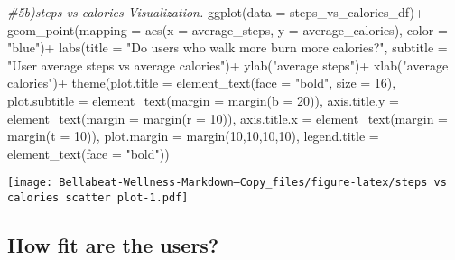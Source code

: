 \documentclass[
]{article}
\newenvironment{Shaded}{\begin{snugshade}}{\end{snugshade}}
\newcommand{\AttributeTok}[1]{\textcolor[rgb]{0.77,0.63,0.00}{#1}}
\newcommand{\CommentTok}[1]{\textcolor[rgb]{0.56,0.35,0.01}{\textit{#1}}}
\newcommand{\DecValTok}[1]{\textcolor[rgb]{0.00,0.00,0.81}{#1}}
\newcommand{\FunctionTok}[1]{\textcolor[rgb]{0.00,0.00,0.00}{#1}}
\newcommand{\NormalTok}[1]{#1}
\newcommand{\SpecialCharTok}[1]{\textcolor[rgb]{0.00,0.00,0.00}{#1}}
\newcommand{\StringTok}[1]{\textcolor[rgb]{0.31,0.60,0.02}{#1}}
\begin{document}
\begin{Shaded}
\begin{Highlighting}[]
\CommentTok{\#5b)steps vs calories Visualization.}
\FunctionTok{ggplot}\NormalTok{(}\AttributeTok{data =}\NormalTok{ steps\_vs\_calories\_df)}\SpecialCharTok{+}
  \FunctionTok{geom\_point}\NormalTok{(}\AttributeTok{mapping =} \FunctionTok{aes}\NormalTok{(}\AttributeTok{x =}\NormalTok{ average\_steps, }\AttributeTok{y =}\NormalTok{ average\_calories),}
             \AttributeTok{color =} \StringTok{"blue"}\NormalTok{)}\SpecialCharTok{+}
  \FunctionTok{labs}\NormalTok{(}\AttributeTok{title =} \StringTok{"Do users who walk more burn more calories?"}\NormalTok{,}
       \AttributeTok{subtitle =} \StringTok{"User average steps vs average calories"}\NormalTok{)}\SpecialCharTok{+}
  \FunctionTok{ylab}\NormalTok{(}\StringTok{"average steps"}\NormalTok{)}\SpecialCharTok{+}
   \FunctionTok{xlab}\NormalTok{(}\StringTok{"average calories"}\NormalTok{)}\SpecialCharTok{+}
  \FunctionTok{theme}\NormalTok{(}\AttributeTok{plot.title =} \FunctionTok{element\_text}\NormalTok{(}\AttributeTok{face =} \StringTok{"bold"}\NormalTok{, }\AttributeTok{size =} \DecValTok{16}\NormalTok{),}
        \AttributeTok{plot.subtitle =} \FunctionTok{element\_text}\NormalTok{(}\AttributeTok{margin =} \FunctionTok{margin}\NormalTok{(}\AttributeTok{b =} \DecValTok{20}\NormalTok{)),}
        \AttributeTok{axis.title.y =} \FunctionTok{element\_text}\NormalTok{(}\AttributeTok{margin =} \FunctionTok{margin}\NormalTok{(}\AttributeTok{r =} \DecValTok{10}\NormalTok{)),}
        \AttributeTok{axis.title.x =} \FunctionTok{element\_text}\NormalTok{(}\AttributeTok{margin =} \FunctionTok{margin}\NormalTok{(}\AttributeTok{t =} \DecValTok{10}\NormalTok{)),}
        \AttributeTok{plot.margin =} \FunctionTok{margin}\NormalTok{(}\DecValTok{10}\NormalTok{,}\DecValTok{10}\NormalTok{,}\DecValTok{10}\NormalTok{,}\DecValTok{10}\NormalTok{),}
        \AttributeTok{legend.title =} \FunctionTok{element\_text}\NormalTok{(}\AttributeTok{face =} \StringTok{"bold"}\NormalTok{))}
\end{Highlighting}
\end{Shaded}

\texttt{[image: Bellabeat-Wellness-Markdown---Copy\_files/figure-latex/steps vs calories scatter plot-1.pdf]}

\hypertarget{how-fit-are-the-users}{%
\subsection{How fit are the users?}\label{how-fit-are-the-users}}
\end{document}
